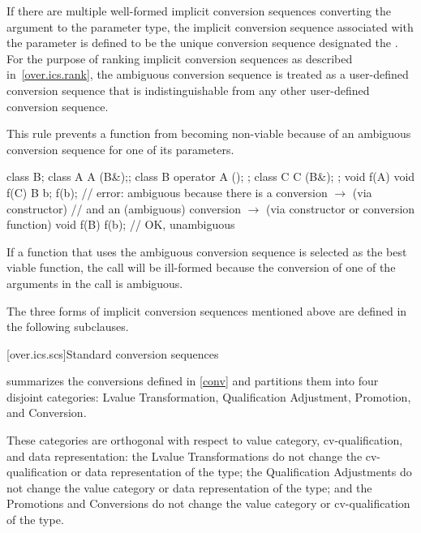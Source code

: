 \pnum
If there are multiple well-formed implicit conversion sequences
converting the argument to the parameter type, the implicit
conversion sequence associated with the parameter is defined to be
the unique conversion sequence designated the
.
For the purpose of ranking implicit conversion sequences as described
in~\ref{over.ics.rank}, the ambiguous conversion sequence is treated
as a user-defined conversion sequence that is indistinguishable from any
other user-defined conversion sequence.
\begin{note}
This rule prevents a function from becoming non-viable because of an ambiguous
conversion sequence for one of its parameters.
\begin{example}
\begin{codeblock}
class B;
class A { A (B&);};
class B { operator A (); };
class C { C (B&); };
void f(A) { }
void f(C) { }
B b;
f(b);               // error: ambiguous because there is a conversion  $\to$  (via constructor)
                    // and an (ambiguous) conversion  $\to$  (via constructor or conversion function)
void f(B) { }
f(b);               // OK, unambiguous
\end{codeblock}
\end{example}
\end{note}
If a function that uses the ambiguous conversion sequence is selected
as the best viable function, the call will be ill-formed because the conversion
of one of the arguments in the call is ambiguous.

\pnum
The three forms of implicit conversion sequences mentioned above
are defined in the following subclauses.

[over.ics.scs]{Standard conversion sequences}

\pnum
{}
summarizes the conversions defined in \ref{conv} and
partitions them into four disjoint categories: Lvalue Transformation,
Qualification Adjustment, Promotion, and Conversion.
\begin{note}
These categories are orthogonal with respect to value category,
cv-qualification, and data representation: the Lvalue Transformations
do not change the cv-qualification or data
representation of the type; the Qualification Adjustments do not
change the value category or data representation of the type; and
the Promotions and Conversions do not change the
value category or cv-qualification of the type.
\end{note}

